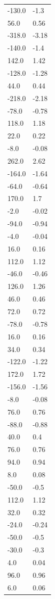 \begin{longtable}{ll}
-130.0 & -1.3 \\
56.0 & 0.56 \\
-318.0 & -3.18 \\
-140.0 & -1.4 \\
142.0 & 1.42 \\
-128.0 & -1.28 \\
44.0 & 0.44 \\
-218.0 & -2.18 \\
-78.0 & -0.78 \\
118.0 & 1.18 \\
22.0 & 0.22 \\
-8.0 & -0.08 \\
262.0 & 2.62 \\
-164.0 & -1.64 \\
-64.0 & -0.64 \\
170.0 & 1.7 \\
-2.0 & -0.02 \\
-94.0 & -0.94 \\
-4.0 & -0.04 \\
16.0 & 0.16 \\
112.0 & 1.12 \\
-46.0 & -0.46 \\
126.0 & 1.26 \\
46.0 & 0.46 \\
72.0 & 0.72 \\
-78.0 & -0.78 \\
16.0 & 0.16 \\
34.0 & 0.34 \\
-122.0 & -1.22 \\
172.0 & 1.72 \\
-156.0 & -1.56 \\
-8.0 & -0.08 \\
76.0 & 0.76 \\
-88.0 & -0.88 \\
40.0 & 0.4 \\
76.0 & 0.76 \\
94.0 & 0.94 \\
8.0 & 0.08 \\
-50.0 & -0.5 \\
112.0 & 1.12 \\
32.0 & 0.32 \\
-24.0 & -0.24 \\
-50.0 & -0.5 \\
-30.0 & -0.3 \\
4.0 & 0.04 \\
96.0 & 0.96 \\
6.0 & 0.06 \\

\end{longtable}
